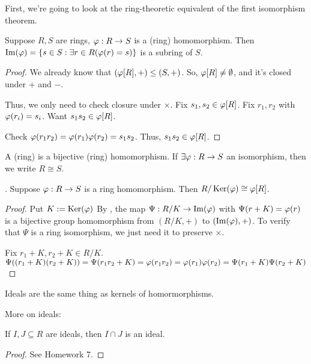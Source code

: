 \documentclass[notes.tex]{subfiles}
\begin{document}
First, we're going to look at the ring-theoretic equivalent of the first isomorphism theorem.

\begin{proposition}
	Suppose $R, S$ are rings, $\varphi:R\to S$ is a (ring) homomorphism. Then $\operatorname{\mathrm{Im}}(\varphi) = \{s\in S : \exists r\in R (\varphi(r) = s)\}$
	is a subring of $S$.
\end{proposition}
\begin{proof}
	We already know that $(\varphi[R], +) \le (S, +)$. So, $\varphi[R]\ne\emptyset$, and it's closed under $+$ and $-$.

	Thus, we only need to check closure under $\times$.
	Fix $s_1, s_2\in \varphi[R]$. Fix $r_1, r_2$ with $\varphi(r_i) = s_i$. Want $s_1s_2\in \varphi[R]$.

	Check $\varphi(r_1r_2) = \varphi(r_1)\varphi(r_2) = s_1s_2$. Thus, $s_1s_2\in \varphi[R]$.
\end{proof}

\begin{defn}
	A (ring)  is a bijective (ring) homomorphism.
	If $\exists \varphi:R\to S$ an isomorphism, then we write $R\cong S$.
\end{defn}

\begin{theorem}
\label{FITR}
.
Suppose $\varphi: R\to S$ is a ring homomorphism. Then $R/\operatorname{\mathrm{Ker}}(\varphi)\cong \varphi[R]$.
\end{theorem}
\begin{proof}
	Put $K:= \operatorname{\mathrm{Ker}}(\varphi)$
	By , the map $\Psi:R/K\to \operatorname{\mathrm{Im}}(\varphi)$ with $\Psi(r+K) = \varphi(r)$ is a bijective group homomorphism from $(R/K, +)$ to $(\operatorname{\mathrm{Im}}(\varphi), +)$.
	To verify that $\Psi$ is a ring isomorphism, we just need it to preserve $\times$.

	Fix $r_1+K, r_2+K \in R/K$. $\Psi((r_1+K)(r_2+K)) = \Psi(r_1r_2 + K) = \varphi(r_1r_2) = \varphi(r_1) \varphi(r_2) = \Psi(r_1+K)\Psi(r_2 + K)$
\end{proof}

Ideals are the same thing as kernels of homormorphisms.

More on ideals:

\begin{proposition}
	If $I, J\subseteq R$ are ideals, then $I\cap J$ is an ideal.
\end{proposition}
\begin{proof}
	See Homework 7.
\end{proof}
\end{document}
